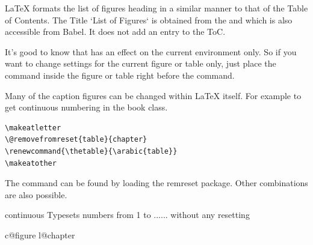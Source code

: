 LaTeX formats the list of figures heading in a similar manner to that of the Table of Contents. The Title `List of Figures` is obtained from the  and which is also accessible from Babel. It does not add an entry to the ToC.



It’s good to know that  has an effect on the current environment only.
So if you want to change settings for the current figure or table only, just place the
 command inside the figure or table right before the 
command.


Many of the caption figures can be changed within LaTeX itself. For example to get continuous numbering in the book class.

\begin{lstlisting}
\makeatletter
\@removefromreset{table}{chapter}
\renewcommand{\thetable}{\arabic{table}}
\makeatother
\end{lstlisting}

The command  can be found by loading the remreset package. Other combinations are also possible.


\begin{marglist}
\item{continuous} Typesets numbers from 1 to ...... without any resetting
\end{marglist}
%

\def\@removefromreset#1#2{\let\@tempb\@elt
   \expandafter\let\expandafter\@tempa\csname c@#1\endcsname
   \def\@elt##1{\expandafter\ifx\csname c@##1\endcsname\@tempa\else
         \noexpand\@elt{##1}\fi}%
   \expandafter\edef\csname cl@#2\endcsname{\csname cl@#2\endcsname}%
   \let\@elt\@tempb}

\@removefromreset{figure}{chapter}
\renewcommand{\thefigure}{\arabic{figure}}


